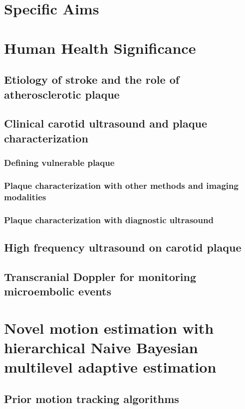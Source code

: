 \documentclass[12pt,twoside]{withesis}
\begin{document}
\tableofcontents

\chapter{Specific Aims}


\chapter{Human Health Significance}

\section{Etiology of stroke and the role of atherosclerotic plaque}
\section{Clinical carotid ultrasound and plaque characterization}
\subsection{Defining vulnerable plaque}
\subsection{Plaque characterization with other methods and imaging modalities}
\subsection{Plaque characterization with diagnostic ultrasound}
\section{High frequency ultrasound on carotid plaque}
\section{Transcranial Doppler for monitoring microembolic events}


\chapter{Novel motion estimation with hierarchical Naive Bayesian multilevel
adaptive estimation}

\section{Prior motion tracking algorithms}
\end{document}
